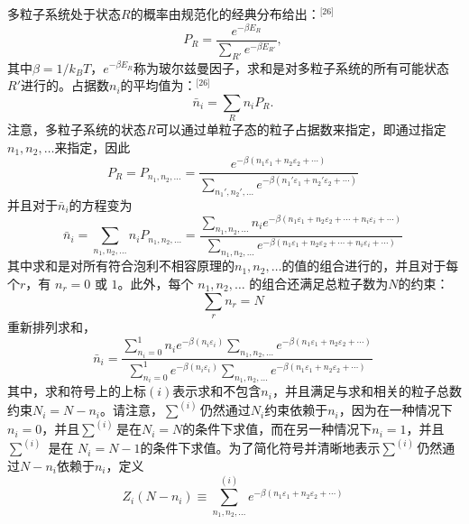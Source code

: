 多粒子系统处于状态\(R\)的概率由规范化的经典分布给出：\(^\text{[26]}\)
\[
P_R = \frac{e^{-\beta E_R}}{\sum_{R'} e^{-\beta E_{R'}}},~
\]
其中\(\beta = 1/k_B T\)，\( e^{-\beta E_R} \)称为玻尔兹曼因子，求和是对多粒子系统的所有可能状态\(R'\)进行的。占据数\(n_i\)的平均值为：\(^\text{[26]}\)
\[
\bar{n}_i = \sum_R n_i P_R.~
\]
注意，多粒子系统的状态\(R\)可以通过单粒子态的粒子占据数来指定，即通过指定\( n_1, n_2, \ldots\)来指定，因此
\[
P_R = P_{n_1, n_2, \ldots} = \frac{e^{-\beta (n_1 \varepsilon_1 + n_2 \varepsilon_2 + \cdots )}}{\sum_{n_1', n_2', \ldots} e^{-\beta (n_1' \varepsilon_1 + n_2' \varepsilon_2 + \cdots )}}~
\]
并且对于\(\bar{n}_i\)的方程变为
\[
\bar{n}_i = \sum_{n_1, n_2, \dots} n_i P_{n_1, n_2, \dots} = \frac{\sum_{n_1, n_2, \dots} n_i e^{-\beta (n_1 \varepsilon_1 + n_2 \varepsilon_2 + \cdots + n_i \varepsilon_i + \cdots )}}{\sum_{n_1, n_2, \dots} e^{-\beta (n_1 \varepsilon_1 + n_2 \varepsilon_2 + \cdots + n_i \varepsilon_i + \cdots )}}~
\]
其中求和是对所有符合泡利不相容原理的\(n_1, n_2, \ldots\)的值的组合进行的，并且对于每个\( r \)，有 \( n_r = 0 \) 或 \( 1 \)。此外，每个 \( n_1, n_2, \ldots \) 的组合还满足总粒子数为\(N\)的约束：
\[
\sum_r n_r = N~
\]
重新排列求和，
\[
\bar{n}_i = \frac{\sum_{n_i=0}^{1} n_i e^{-\beta (n_i \varepsilon_i)} \sum_{n_1, n_2, \dots} e^{-\beta (n_1 \varepsilon_1 + n_2 \varepsilon_2 + \cdots )}}{\sum_{n_i=0}^{1} e^{-\beta (n_i \varepsilon_i)} \sum_{n_1, n_2, \dots} e^{-\beta (n_1 \varepsilon_1 + n_2 \varepsilon_2 + \cdots )}}~
\]
其中，求和符号上的上标\( (i) \)表示求和不包含\( n_i \)，并且满足与求和相关的粒子总数约束\( N_i = N - n_i \)。请注意，\( \sum^{(i)} \)仍然通过\( N_i \)约束依赖于\( n_i \)，因为在一种情况下\( n_i = 0 \)，并且\( \sum^{(i)} \)是在\( N_i = N \)的条件下求值，而在另一种情况下\( n_i = 1 \)，并且\( \sum^{(i)} \) 是在 \( N_i = N - 1 \)的条件下求值。为了简化符号并清晰地表示\( \sum^{(i)} \)仍然通过\( N - n_i \)依赖于\( n_i \)，定义
\[
Z_i(N - n_i) \equiv \sum^{(i)}_{n_1, n_2, \dots} e^{-\beta (n_1 \varepsilon_1 + n_2 \varepsilon_2 + \cdots )}~
\]